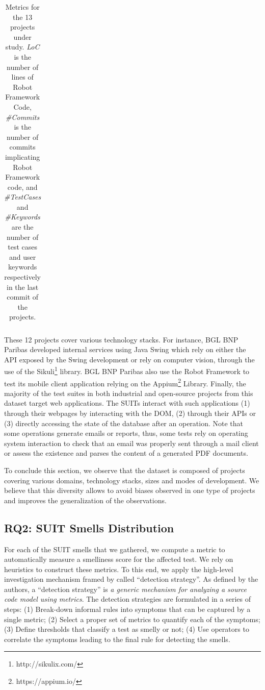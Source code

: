 \begin{table}
\begin{tabularx}{\textwidth}{LRRRR}
\hline

\end{tabularx}

\caption{Metrics for the 13 projects under study. \emph{LoC} is the number of lines of Robot Framework Code, \emph{\#Commits} is the number of commits implicating Robot Framework code, and \emph{\#TestCases} and \emph{\#Keywords} are the number of test cases and user keywords respectively in the last commit of the projects.}
\label{tab:projects}

\end{table}

These 12 projects cover various technology stacks. For instance, BGL BNP Paribas developed internal services using Java Swing which rely on either the API exposed by the Swing development or rely on computer vision, through the use of the Sikuli\footnote{http://sikulix.com/} library. BGL BNP Paribas also use the Robot Framework to test its mobile client application relying on the Appium\footnote{https://appium.io/} Library. Finally, the majority of the test suites in both industrial and open-source projects from this dataset target web applications. The SUITs interact with such applications (1) through their webpages by interacting with the DOM, (2) through their APIs or (3) directly accessing the state of the database after an operation. Note that some operations generate emails or reports, thus, some tests rely on operating system interaction to check that an email was properly sent through a mail client or assess the existence and parses the content of a generated PDF documents.

To conclude this section, we observe that the dataset is composed of projects covering various domains, technology stacks, sizes and modes of development. We believe that this diversity allows to avoid biases observed in one type of projects and improves the generalization of the observations.

\subsection{RQ2: SUIT Smells Distribution}
\label{sec:smell-detection}

For each of the SUIT smells that we gathered, we compute a metric to automatically measure a smelliness score for the affected test. We rely on heuristics to construct these metrics. To this end, we apply the high-level investigation mechanism framed by \textcite{Marinescu2004} called ``detection strategy''. As defined by the authors, a ``detection strategy'' is \emph{a generic mechanism for analyzing a source code model using metrics}. The detection strategies are formulated in a series of steps: (1) Break-down informal rules into symptoms that can be captured by a single metric; (2) Select a proper set of metrics to quantify each of the symptoms; (3) Define thresholds that classify a test as smelly or not; (4) Use operators to correlate the symptoms leading to the final rule for detecting the smells.

